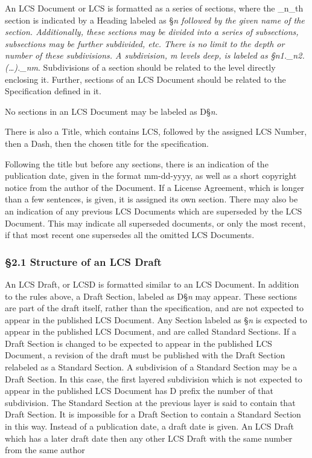 An LCS Document or LCS is formatted as a series of sections, where the
\_n\_th section is indicated by a Heading labeled as §\emph{n
\emph{followed by the given name of the section. Additionally, these
sections may be divided into a series of subsections, subsections may be
further subdivided, etc. There is no limit to the depth or number of
these subdivisions. A subdivision, m levels deep, is labeled as
§\emph{n1}.\_n2}.(\ldots).\_nm}. Subdivisions of a section should be
related to the level directly enclosing it. Further, sections of an LCS
Document should be related to the Specification defined in it.

No sections in an LCS Document may be labeled as D§\emph{n}.

There is also a Title, which contains LCS, followed by the assigned LCS
Number, then a Dash, then the chosen title for the specification.

Following the title but before any sections, there is an indication of
the publication date, given in the format mm-dd-yyyy, as well as a short
copyright notice from the author of the Document. If a License
Agreement, which is longer than a few sentences, is given, it is
assigned its own section. There may also be an indication of any
previous LCS Documents which are superseded by the LCS Document. This
may indicate all superseded documents, or only the most recent, if that
most recent one supersedes all the omitted LCS Documents.

\hypertarget{structure-of-an-lcs-draft}{%
\subsubsection{§2.1 Structure of an LCS
Draft}\label{structure-of-an-lcs-draft}}

An LCS Draft, or LCSD is formatted similar to an LCS Document. In
addition to the rules above, a Draft Section, labeled as D§\emph{n} may
appear. These sections are part of the draft itself, rather than the
specification, and are not expected to appear in the published LCS
Document. Any Section labeled as §\emph{n} is expected to appear in the
published LCS Document, and are called Standard Sections. If a Draft
Section is changed to be expected to appear in the published LCS
Document, a revision of the draft must be published with the Draft
Section relabeled as a Standard Section. A subdivision of a Standard
Section may be a Draft Section. In this case, the first layered
subdivision which is not expected to appear in the published LCS
Document has D prefix the number of that subdivision. The Standard
Section at the previous layer is said to contain that Draft Section. It
is impossible for a Draft Section to contain a Standard Section in this
way. Instead of a publication date, a draft date is given. An LCS Draft
which has a later draft date then any other LCS Draft with the same number
from the same author

